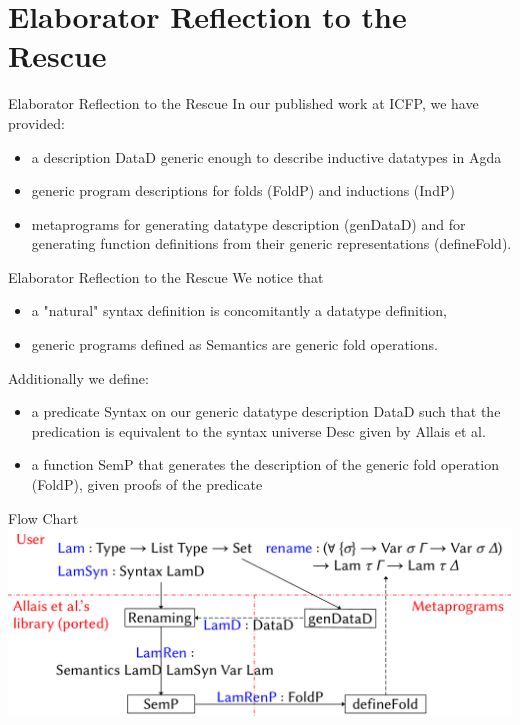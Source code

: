 \documentclass[10pt,xcolor=svgnames]{beamer} %
\begin{document}
\section{Elaborator Reflection to the Rescue}

\begin{frame}[fragile]{Elaborator Reflection to the Rescue}
	In our published work at ICFP, we have provided:
	\begin{itemize}
		\item a description DataD generic enough to describe inductive datatypes in Agda
		\item generic program descriptions for folds (FoldP) and inductions (IndP)
		\item metaprograms for generating datatype description (genDataD) and for generating function definitions from their generic representations (defineFold).
	\end{itemize}
\end{frame}

\begin{frame}[fragile]{Elaborator Reflection to the Rescue}
	We notice that
	\begin{itemize}
		\item a "natural" syntax definition is concomitantly a datatype definition,
		\item generic programs defined as Semantics are generic fold operations.
	\end{itemize}
	\pause
	Additionally we define:
	\begin{itemize}
		\item a predicate Syntax on our generic datatype description DataD such that the predication is equivalent to the syntax universe Desc given by Allais et al.
		\item a function SemP that generates the description of the generic fold operation (FoldP), given proofs of the predicate
	\end{itemize}
\end{frame}

\begin{frame}[fragile]{Flow Chart}
\includegraphics[width=\columnwidth]{Diagram.pdf}
\end{frame}
\end{document}
